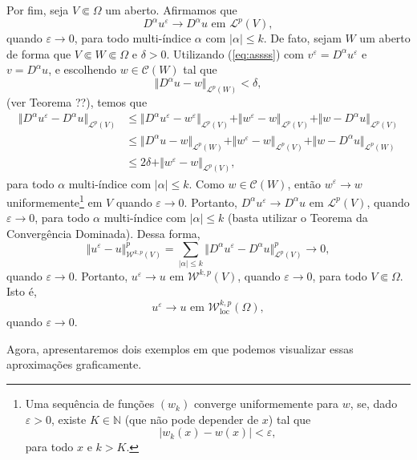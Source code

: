 \documentclass[a4paper, 11pt]{book}
\theoremstyle{definition}
\newcommand{\bN}{\mathbb{N}}
\newcommand{\cC}{\mathcal{C}}
\newcommand{\cL}{\mathcal{L}}
\newcommand{\cW}{\mathcal{W}}
\newcommand{\loc}{\mathrm{loc}}
\begin{document}
\begin{prf}
    Por fim, seja $V \Subset \Omega$ um aberto. Afirmamos que
    \begin{equation}
        D ^\alpha u^\varepsilon \to D^\alpha u \text{ em } \cL^p(V),
    \end{equation}
    quando $\varepsilon \to 0$, para todo multi-índice $\alpha$ com $|\alpha| \leqslant k$.
    De fato, sejam $W$ um aberto de forma que $V \Subset W \Subset \Omega$ e $\delta > 0$. Utilizando (\ref{eq:assss}) com $v ^\varepsilon = D^\alpha u^\varepsilon$ e $v = D^\alpha u$, e escolhendo $w \in \cC(W)$ tal que
    \[
        \Vert D^\alpha u - w \Vert_{\cL^p(W)} < \delta,
    \]
    (ver Teorema ??), temos que
    \[
        \begin{aligned}
            \Vert D^\alpha u^\varepsilon - D^\alpha u \Vert_{\cL^p(V)} 
            &\leqslant \Vert D^\alpha u^\varepsilon - w^\varepsilon \Vert_{\cL^p(V)} + \Vert w^\varepsilon - w \Vert_{\cL^p(V)} + \Vert w - D^\alpha u \Vert_{\cL^p(V)}\\
            &\leqslant \Vert D^\alpha u - w \Vert_{\cL^p(W)} + \Vert w^\varepsilon - w \Vert_{\cL^p(V)} + \Vert w - D^\alpha u \Vert_{\cL^p(W)}\\ 
            &\leqslant 2\delta + \Vert w^\varepsilon - w \Vert_{\cL^p(V)},
        \end{aligned}
    \]
    para todo $\alpha$ multi-índice com $|\alpha| \leqslant k$.
    Como $w \in \cC(W)$, então $w^\varepsilon \to w$ uniformemente\footnote{Uma sequência de funções $(w_k)$ converge uniformemente para $w$, se, dado $\varepsilon > 0$, existe $K \in \bN$ (que não pode depender de $x$) tal que
    \[
        | w_k(x) - w(x) | < \varepsilon,
    \]
    para todo $x$ e $k > K$.
    } em $V$ quando $\varepsilon \to 0$. 
    Portanto, $D^\alpha u^\varepsilon \to D^\alpha u$ em $\cL^p(V)$, quando $\varepsilon \to 0$, para todo $\alpha$ multi-índice com $|\alpha| \leqslant k$ (basta utilizar o Teorema da Convergência Dominada).
    Dessa forma,
    \[
        \Vert u^\varepsilon - u \Vert^p_{\cW^{k,p}(V)} = \sum_{|\alpha| \leqslant k} \Vert D^\alpha u^\varepsilon - D^\alpha u \Vert^p_{\cL^p(V)} \to 0,
    \]
    quando $\varepsilon \to 0$. Portanto, $u^\varepsilon \to u$ em $\cW^{k,p}(V)$, quando $\varepsilon \to 0$, para todo $V \Subset \Omega$. Isto é,
    \[
        u^\varepsilon \to u \text{ em } \cW^{k,p}_\loc(\Omega),
    \]
    quando $\varepsilon \to 0$.
\end{prf}

Agora, apresentaremos dois exemplos em que podemos visualizar essas aproximações graficamente.
\end{document}
